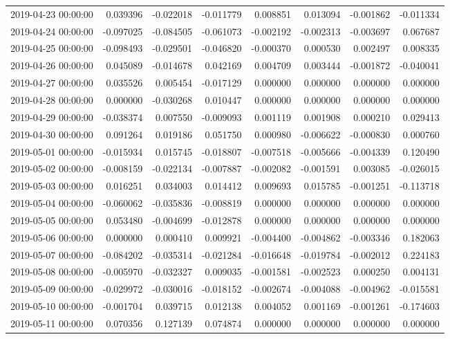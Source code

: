 \begin{tabular}{lrrrrrrr}
2019-04-23 00:00:00 & 0.039396 & -0.022018 & -0.011779 & 0.008851 & 0.013094 & -0.001862 & -0.011334 \\
2019-04-24 00:00:00 & -0.097025 & -0.084505 & -0.061073 & -0.002192 & -0.002313 & -0.003697 & 0.067687 \\
2019-04-25 00:00:00 & -0.098493 & -0.029501 & -0.046820 & -0.000370 & 0.000530 & 0.002497 & 0.008335 \\
2019-04-26 00:00:00 & 0.045089 & -0.014678 & 0.042169 & 0.004709 & 0.003444 & -0.001872 & -0.040041 \\
2019-04-27 00:00:00 & 0.035526 & 0.005454 & -0.017129 & 0.000000 & 0.000000 & 0.000000 & 0.000000 \\
2019-04-28 00:00:00 & 0.000000 & -0.030268 & 0.010447 & 0.000000 & 0.000000 & 0.000000 & 0.000000 \\
2019-04-29 00:00:00 & -0.038374 & 0.007550 & -0.009093 & 0.001119 & 0.001908 & 0.000210 & 0.029413 \\
2019-04-30 00:00:00 & 0.091264 & 0.019186 & 0.051750 & 0.000980 & -0.006622 & -0.000830 & 0.000760 \\
2019-05-01 00:00:00 & -0.015934 & 0.015745 & -0.018807 & -0.007518 & -0.005666 & -0.004339 & 0.120490 \\
2019-05-02 00:00:00 & -0.008159 & -0.022134 & -0.007887 & -0.002082 & -0.001591 & 0.003085 & -0.026015 \\
2019-05-03 00:00:00 & 0.016251 & 0.034003 & 0.014412 & 0.009693 & 0.015785 & -0.001251 & -0.113718 \\
2019-05-04 00:00:00 & -0.060062 & -0.035836 & -0.008819 & 0.000000 & 0.000000 & 0.000000 & 0.000000 \\
2019-05-05 00:00:00 & 0.053480 & -0.004699 & -0.012878 & 0.000000 & 0.000000 & 0.000000 & 0.000000 \\
2019-05-06 00:00:00 & 0.000000 & 0.000410 & 0.009921 & -0.004400 & -0.004862 & -0.003346 & 0.182063 \\
2019-05-07 00:00:00 & -0.084202 & -0.035314 & -0.021284 & -0.016648 & -0.019784 & -0.002012 & 0.224183 \\
2019-05-08 00:00:00 & -0.005970 & -0.032327 & 0.009035 & -0.001581 & -0.002523 & 0.000250 & 0.004131 \\
2019-05-09 00:00:00 & -0.029972 & -0.030016 & -0.018152 & -0.002674 & -0.004088 & -0.004962 & -0.015581 \\
2019-05-10 00:00:00 & -0.001704 & 0.039715 & 0.012138 & 0.004052 & 0.001169 & -0.001261 & -0.174603 \\
2019-05-11 00:00:00 & 0.070356 & 0.127139 & 0.074874 & 0.000000 & 0.000000 & 0.000000 & 0.000000 \\

\end{tabular}

